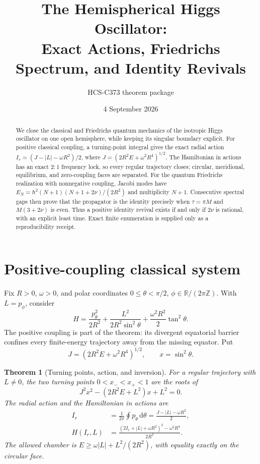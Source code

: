 \documentclass[10pt]{article}
\title{The Hemispherical Higgs Oscillator:\\
Exact Actions, Friedrichs Spectrum, and Identity Revivals}
\author{HCS-C373 theorem package}
\date{4 September 2026}
\newcommand{\RR}{\mathbb R}
\newcommand{\ZZ}{\mathbb Z}
\newcommand{\dd}{\,\mathrm d}
\newtheorem{theorem}{Theorem}
\begin{document}
\maketitle

\begin{abstract}
We close the classical and Friedrichs quantum mechanics of the isotropic
Higgs oscillator on one open hemisphere, while keeping its singular boundary
explicit.  For positive classical coupling, a turning-point integral gives
the exact radial action
$I_r=(J-|L|-\omega R^2)/2$, where
$J=(2R^2E+\omega^2R^4)^{1/2}$.  The Hamiltonian in actions has an exact
$2{:}1$ frequency lock, so every regular trajectory closes; circular,
meridional, equilibrium, and zero-coupling faces are separated.  For the
quantum Friedrichs realization with nonnegative coupling, Jacobi modes have
$E_N=\hbar^2(N+1)(N+1+2\nu)/(2R^2)$ and multiplicity $N+1$.  Consecutive
spectral gaps then prove that the propagator is the identity precisely when
$\tau=\pi M$ and $M(3+2\nu)$ is even.  Thus a positive identity revival exists
if and only if $2\nu$ is rational, with an explicit least time.  Exact finite
enumeration is supplied only as a reproducibility receipt.
\end{abstract}

\section{Positive-coupling classical system}
Fix $R>0$, $\omega>0$, and polar coordinates
$0\leq\theta<\pi/2$, $\phi\in\RR/(2\pi\ZZ)$.  With $L=p_\phi$, consider
\begin{equation}
 H=\frac{p_\theta^2}{2R^2}
 +\frac{L^2}{2R^2\sin^2\theta}
 +\frac{\omega^2R^2}{2}\tan^2\theta .
 \label{eq:H}
\end{equation}
The positive coupling is part of the theorem: its divergent equatorial
barrier confines every finite-energy trajectory away from the missing
equator.  Put
\[
 J=(2R^2E+\omega^2R^4)^{1/2},\qquad x=\sin^2\theta .
\]

\begin{theorem}[Turning points, action, and inversion]
For a regular trajectory with $L\ne0$, the two turning points
$0<x_-<x_+<1$ are the roots of
\begin{equation}
 J^2x^2-(2R^2E+L^2)x+L^2=0.       \label{eq:turning}
\end{equation}
The radial action and the Hamiltonian in actions are
\begin{align}
 I_r&=\frac{1}{2\pi}\oint p_\theta\dd\theta
     =\frac{J-|L|-\omega R^2}{2},                 \label{eq:action}\\
 H(I_r,L)&=\frac{(2I_r+|L|+\omega R^2)^2-
                    \omega^2R^4}{2R^2}.           \label{eq:inverse}
\end{align}
The allowed chamber is
$E\geq\omega|L|+L^2/(2R^2)$, with equality exactly on the circular face.
\end{theorem}
\end{document}
